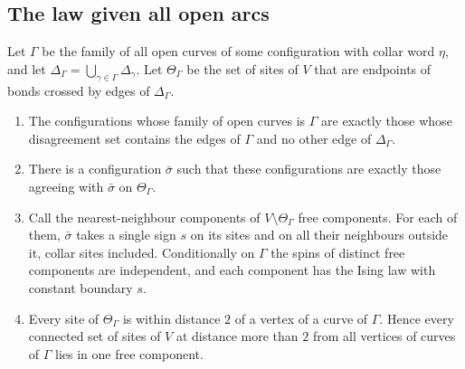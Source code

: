 \subsection{The law given all open arcs}
\begin{lemma}\label{lem:openlaw}
Let $\Gamma$ be the family of all open curves of some configuration with collar word $\eta$, and let $\Delta_\Gamma=\bigcup_{\gamma\in\Gamma}\Delta_\gamma$. Let $\Theta_\Gamma$ be the set of sites of $V$ that are endpoints of bonds crossed by edges of $\Delta_\Gamma$.
\begin{enumerate}
\item The configurations whose family of open curves is $\Gamma$ are exactly those whose disagreement set contains the edges of $\Gamma$ and no other edge of $\Delta_\Gamma$.
\item There is a configuration $\bar\sigma$ such that these configurations are exactly those agreeing with $\bar\sigma$ on $\Theta_\Gamma$.
\item Call the nearest-neighbour components of $V\setminus\Theta_\Gamma$ free components. For each of them, $\bar\sigma$ takes a single sign $s$ on its sites and on all their neighbours outside it, collar sites included. Conditionally on $\Gamma$ the spins of distinct free components are independent, and each component has the Ising law with constant boundary $s$.
\item Every site of $\Theta_\Gamma$ is within distance $2$ of a vertex of a curve of $\Gamma$. Hence every connected set of sites of $V$ at distance more than $2$ from all vertices of curves of $\Gamma$ lies in one free component.
\end{enumerate}
\end{lemma}
